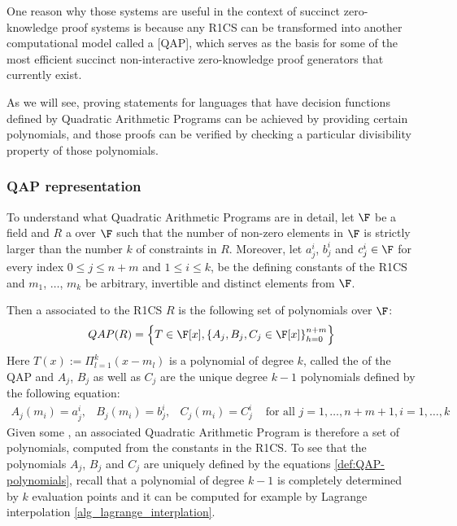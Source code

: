 One reason why those systems are useful in the context of succinct zero-knowledge proof systems is because any R1CS can be transformed into another computational model called a  [QAP], which serves as the basis for some of the most efficient succinct non-interactive zero-knowledge proof generators that currently exist. 

As we will see, proving statements for languages that have decision functions defined by Quadratic Arithmetic Programs can be achieved by providing certain polynomials, and those proofs can be verified by checking a particular divisibility property of those polynomials.
 
\subsubsection{QAP representation} To understand what Quadratic Arithmetic Programs are in detail, let $\F$ be a field and $R$ a  over $\F$ such that the number of non-zero elements in $\F$ is strictly larger than the number $k$ of constraints in $R$. Moreover, let $a_j^i$, $b_j^i$ and $c_j^i\in\F$ for every index $0\leq j \leq n+m$ and $1\leq i \leq k$, be the defining constants of the R1CS and $m_1$, $\ldots$, $m_k$ be arbitrary, invertible and distinct elements from $\F$.
  
Then a  associated to the R1CS $R$ is the following set of polynomials over $\F$:
\begin{equation}
\label{def:QAP-target-poly}
QAP(R) = \left\{T\in \F[x],\left\{A_j,B_j,C_j\in \F[x]\right\}_{h=0}^{n+m}\right\}
\end{equation}
Here $T(x) := \Pi_{l=1}^k (x- m_l)$ is a polynomial of degree $k$, called the  of the QAP and $A_j$, $B_j$ as well as $C_j$ are the unique degree $k-1$ polynomials defined by the following equation:
\begin{equation}
\label{def:QAP-polynomials}
\begin{array}{lllr}
A_j(m_i)=a_j^i, & B_j(m_i)=b_j^i, & C_j(m_i)=C_j^i & \text{ for all } j= 1, \ldots , n+m+1, i=1,\ldots,k 
\end{array}
\end{equation}
Given some , an associated Quadratic Arithmetic Program is therefore a set of polynomials, computed from the constants in the R1CS. To see that the polynomials $A_j$, $B_j$ and $C_j$ are uniquely defined by the equations \ref{def:QAP-polynomials}, recall that a polynomial of degree $k-1$ is completely determined by $k$ evaluation points and it can be computed for example by Lagrange interpolation \ref{alg_lagrange_interplation}.

